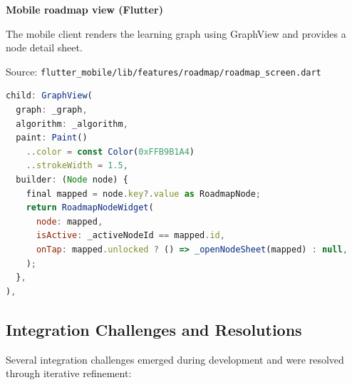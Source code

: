 \textbf{Mobile roadmap view (Flutter)}

The mobile client renders the learning graph using GraphView and provides a node detail sheet.

Source: \texttt{flutter\_mobile/lib/features/roadmap/roadmap\_screen.dart}

\begin{lstlisting}[language=JavaScript, caption=none]
child: GraphView(
  graph: _graph,
  algorithm: _algorithm,
  paint: Paint()
    ..color = const Color(0xFFB9B1A4)
    ..strokeWidth = 1.5,
  builder: (Node node) {
    final mapped = node.key?.value as RoadmapNode;
    return RoadmapNodeWidget(
      node: mapped,
      isActive: _activeNodeId == mapped.id,
      onTap: mapped.unlocked ? () => _openNodeSheet(mapped) : null,
    );
  },
),
\end{lstlisting}

\subsection{Integration Challenges and Resolutions}

Several integration challenges emerged during development and were resolved through iterative refinement:

